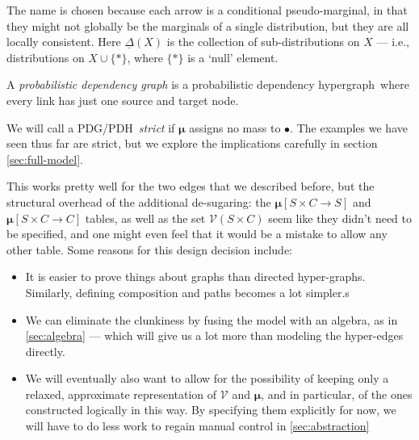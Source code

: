 \documentclass{article}
\newcommand\bmu{\boldsymbol{\mu}}
\newcommand{\modelname}{probabilistic dependency graph}
\newcommand{\modelnamehyper}{probabilistic dependency hypergraph}
\newcommand{\MN}{PDG}
\newcommand{\MNH}{PDH}
\begin{document}
	The name is chosen because each arrow is a conditional pseudo-marginal, in that they might not
	globally be the marginals of a single distribution, but they are all locally consistent. 
	Here $\underline\Delta(X)$ is the collection of sub-distributions on $X$ --- i.e., distributions on $X \cup \{*\}$, where $\{*\}$ is a `null' element. 

	\begin{defn}[\MN]\label{def:model}
		A \textit{\modelname} is a \modelnamehyper\ where every link has just one source and target node.
	\end{defn}

	We will call a \MN/\MNH\ \emph{strict} if $\bmu$ assigns no mass to $\bullet$. The examples we have seen thus far are strict, but we explore the implications carefully in section \ref{sec:full-model}.

	
	




	



	

	\begin{vfull}
		This works pretty well for the two edges that we described before, but the structural overhead of the additional de-sugaring: the $\boldsymbol\mu[S\times C\to S]$ and $\boldsymbol\mu[S\times C\to C]$ tables, as well as the set $\mathcal V(S \times C)$ seem like they didn't need to be specified, and one might even feel that it would be a mistake to allow any other table. Some reasons for this design decision include:
		\begin{itemize}[nosep]
			\item It is easier to prove things about graphs than directed hyper-graphs. Similarly, defining composition and paths becomes a lot simpler.s
			\item We can eliminate the clunkiness by fusing the model with an algebra, as in \cref{sec:algebra} --- which will give us a lot more than modeling the hyper-edges directly.
			\item We will eventually also want to allow for the possibility of keeping only a relaxed, approximate representation of $\mathcal V$ and $\bmu$, and in particular, of the ones constructed logically in this way. By specifying them explicitly for now, we will have to do less work to regain manual control in \cref{sec:abstraction}
		\end{itemize}
	\end{vfull}
\end{document}
